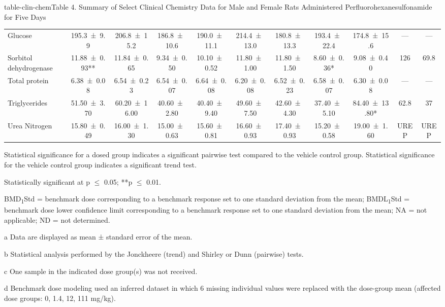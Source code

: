\begin{landscape}
\begin{niehstable}{table-clin-chem}{Table 4. Summary of Select Clinical Chemistry Data for Male and Female Rats Administered Perfluorohexanesulfonamide for Five Days}
\begin{tabular}{lcccccccccc}
Glucose & 195.3 ± 9.9 & 206.8 ± 15.2 & 186.8 ± 10.6 & 190.0 ± 11.1 & 214.4 ± 13.0 & 180.8 ± 13.3 & 193.4 ± 22.4 & 174.8 ± 15.6 & — & — \\
Sorbitol dehydrogenase & 11.88 ± 0.93** & 11.84 ± 0.65 & 9.34 ± 0.50 & 10.10 ± 0.52 & 11.80 ± 1.00 & 11.80 ± 1.50 & 8.60 ± 0.36* & 9.08 ± 0.40 & 126 & 69.8 \\
Total protein & 6.38 ± 0.08 & 6.54 ± 0.23 & 6.54 ± 0.07 & 6.64 ± 0.08 & 6.20 ± 0.08 & 6.52 ± 0.23 & 6.58 ± 0.07 & 6.30 ± 0.08 & — & — \\
Triglycerides & 51.50 ± 3.70 & 60.20 ± 16.00 & 40.60 ± 2.80 & 40.40 ± 9.40 & 49.60 ± 7.50 & 42.60 ± 4.30 & 37.40 ± 5.10 & 84.40 ± 13.80* & 62.8 & 37 \\
Urea Nitrogen & 15.80 ± 0.49 & 16.00 ± 1.30 & 15.00 ± 0.63 & 15.60 ± 0.81 & 16.60 ± 0.93 & 17.40 ± 0.93 & 15.20 ± 0.58 & 19.00 ± 1.60 & UREP & UREP \\
\bottomrule
\end{tabular}
\begin{tablenotes}
\item Statistical significance for a dosed group indicates a significant pairwise test compared to the vehicle control group. Statistical significance for the vehicle control group indicates a significant trend test.
\item *Statistically significant at p \ensuremath{\le} 0.05; **p \ensuremath{\le} 0.01.
\item BMD\textsubscript{1}Std = benchmark dose corresponding to a benchmark response set to one standard deviation from the mean; BMDL\textsubscript{1}Std = benchmark dose lower confidence limit corresponding to a benchmark response set to one standard deviation from the mean; NA = not applicable; ND = not determined.
\item[a] Data are displayed as mean ± standard error of the mean.
\item[b] Statistical analysis performed by the Jonckheere (trend) and Shirley or Dunn (pairwise) tests.
\item[c] One sample in the indicated dose group(s) was not received.
\item[d] Benchmark dose modeling used an inferred dataset in which 6 missing individual values were replaced with the dose-group mean (affected dose groups: 0, 1.4, 12, 111 mg/kg).
\end{tablenotes}
\end{niehstable}
\end{landscape}


